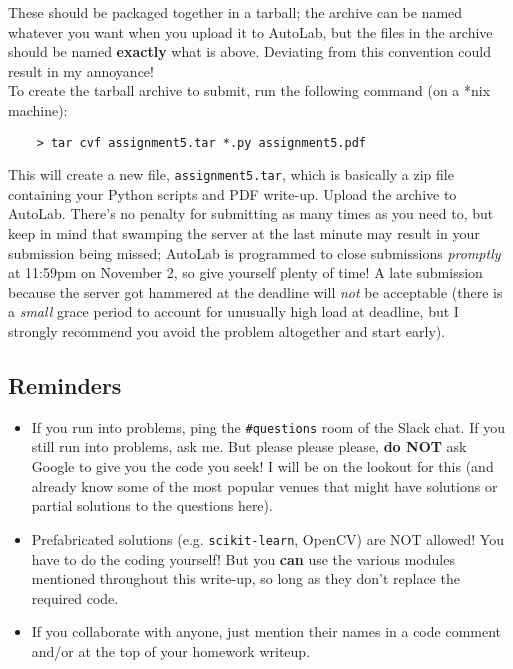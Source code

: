 \documentclass[paper=a4, fontsize=11pt]{scrartcl} %
\numberwithin{figure}{section} %
\numberwithin{table}{section} %
\begin{document}
These should be packaged together in a tarball; the archive can be named whatever you want when you upload it to AutoLab, but the files in the archive should be named \textbf{exactly} what is above. Deviating from this convention could result in my annoyance! \\

To create the tarball archive to submit, run the following command (on a *nix machine):

\begin{verbatim}
	> tar cvf assignment5.tar *.py assignment5.pdf
\end{verbatim}

This will create a new file, \texttt{assignment5.tar}, which is basically a zip file containing your Python scripts and PDF write-up. Upload the archive to AutoLab. There's no penalty for submitting as many times as you need to, but keep in mind that swamping the server at the last minute may result in your submission being missed; AutoLab is programmed to close submissions \emph{promptly} at 11:59pm on November 2, so give yourself plenty of time! A late submission because the server got hammered at the deadline will \emph{not} be acceptable (there is a \emph{small} grace period to account for unusually high load at deadline, but I strongly recommend you avoid the problem altogether and start early). \\

\subsection{Reminders}

\begin{itemize}
	\item If you run into problems, ping the \texttt{\#questions} room of the Slack chat. If you still run into problems, ask me. But please please please, \textbf{do NOT} ask Google to give you the code you seek! I will be on the lookout for this (and already know some of the most popular venues that might have solutions or partial solutions to the questions here).
	\item Prefabricated solutions (e.g. \texttt{scikit-learn}, OpenCV) are NOT allowed! You have to do the coding yourself! But you \textbf{can} use the various modules mentioned throughout this write-up, so long as they don't replace the required code.
	\item If you collaborate with anyone, just mention their names in a code comment and/or at the top of your homework writeup.
\end{itemize}
\end{document}
